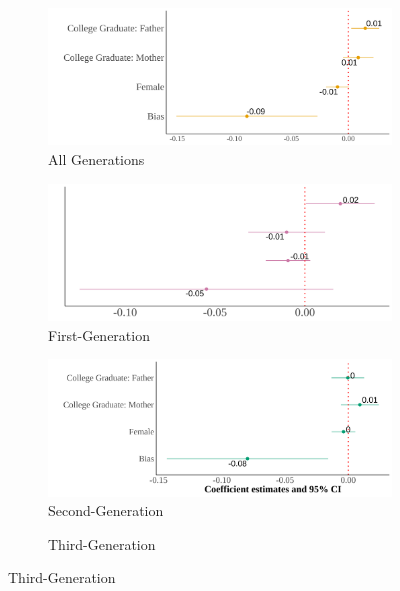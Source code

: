 \begin{center}
\begin{figure}[!htb]
\centering
\caption{Relationship Between Self-Reported Asian Identity and Bias: By Generation}
\label{plot01-regression-gen}
\begin{subfigure}{.48\textwidth}
\caption{All Generations}
\centering
\includegraphics[width=.9\linewidth]{figure/skin-iat-regression-all-gens.png}
\end{subfigure}
\centering
\begin{subfigure}{.48\textwidth}
\caption{First-Generation}
\centering
\includegraphics[width=.9\linewidth]{figure/skin-iat-regression-first-gen.png}
\end{subfigure}
\begin{subfigure}{.48\textwidth}
\caption{Second-Generation}
\centering
\includegraphics[width=.9\linewidth]{figure/skin-iat-regression-second-gen.png}
\end{subfigure}
\begin{subfigure}{.48\textwidth}
\caption{Third-Generation}

\end{subfigure}
\end{figure}
\end{center}
